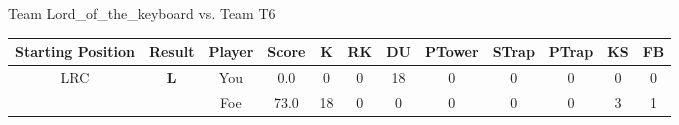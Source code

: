\documentclass[a4paper,12pt]{article}
\begin{document}
\begin{tabular}[t]{| c | c | c | c | c | c | c | c | c | c | c | c
      |}
                      
      
                      
      
                      
      
                      
      
                      
                        \hline
                      \end{tabular}
                      
  \vspace*{2em}
  \par {\large {\color{Gray} Team} Lord\_of\_the\_keyboard {\color{Gray}
      vs. Team} T6}
  \newline
  \begin{tabular}[t]{| c | c | c | c | c | c | c | c | c | c | c | c
      |}
    \hline
    Starting Position & \textbf{Result} & Player & \textbf{Score} & K & RK & DU & PTower & STrap & PTrap & KS & FB \\
    
      
        \hline
        \multirow{2}{*}{  LRC
             } &
              \multirow{2}{*}{  \textbf{L}  } & 
                    \cellcolor{yellow!25} You & \cellcolor{yellow!25} 0.0 & \cellcolor{yellow!25} 0 &
                    \cellcolor{yellow!25} 0 & \cellcolor{yellow!25} 18 & \cellcolor{yellow!25} 0 &
                    \cellcolor{yellow!25} 0 & \cellcolor{yellow!25} 0 & \cellcolor{yellow!25} 0 &
                    \cellcolor{yellow!25} 0 \\
                    \cline{3-12}
                    & & \cellcolor{red!15} Foe & \cellcolor{red!15} 73.0 & \cellcolor{red!15} 18 & \cellcolor{red!15}
                    0 & \cellcolor{red!15} 0
                    & \cellcolor{red!15} 0 & \cellcolor{red!15}
                    0 & \cellcolor{red!15} 0 
                    & \cellcolor{red!15} 3 & \cellcolor{red!15}
                    1 \\
                    
                      
      
                      
      
                      
      
                      
      
                      
      
                      
      
                      
      

\end{tabular}
\end{document}
